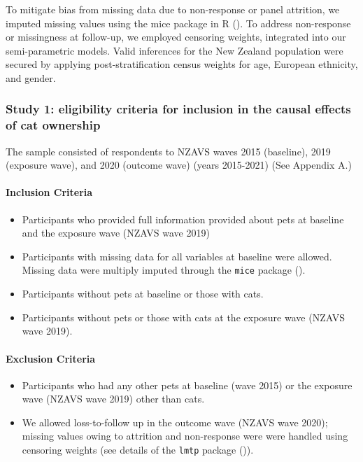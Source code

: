 \documentclass[
  singlecolumn,
  9pt]{article}
\let\oldparagraph\paragraph
\renewcommand{\paragraph}[1]{\oldparagraph{#1}\mbox{}}
\providecommand{\tightlist}{%
  \setlength{\itemsep}{0pt}\setlength{\parskip}{0pt}}\usepackage{longtable,booktabs,array}
\begin{document}
To mitigate bias from missing data due to non-response or panel
attrition, we imputed missing values using the mice package in R
(). To address non-response
or missingness at follow-up, we employed censoring weights, integrated
into our semi-parametric models. Valid inferences for the New Zealand
population were secured by applying post-stratification census weights
for age, European ethnicity, and gender.

\subsubsection{Study 1: eligibility criteria for inclusion in the causal
effects of cat
ownership}\label{study-1-eligibility-criteria-for-inclusion-in-the-causal-effects-of-cat-ownership}

The sample consisted of respondents to NZAVS waves 2015 (baseline), 2019
(exposure wave), and 2020 (outcome wave) (years 2015-2021) (See Appendix
A.)

\paragraph{Inclusion Criteria}\label{inclusion-criteria}

\begin{itemize}
\tightlist
\item
  Participants who provided full information provided about pets at
  baseline and the exposure wave (NZAVS wave 2019)
\item
  Participants with missing data for all variables at baseline were
  allowed. Missing data were multiply imputed through the \texttt{mice}
  package ().
\item
  Participants without pets at baseline or those with cats.
\item
  Participants without pets or those with cats at the exposure wave
  (NZAVS wave 2019).
\end{itemize}

\paragraph{Exclusion Criteria}\label{exclusion-criteria}

\begin{itemize}
\tightlist
\item
  Participants who had any other pets at baseline (wave 2015) or the
  exposure wave (NZAVS wave 2019) other than cats.
\item
  We allowed loss-to-follow up in the outcome wave (NZAVS wave 2020);
  missing values owing to attrition and non-response were were handled
  using censoring weights (see details of the \texttt{lmtp} package
  ()).
\end{itemize}
\end{document}
